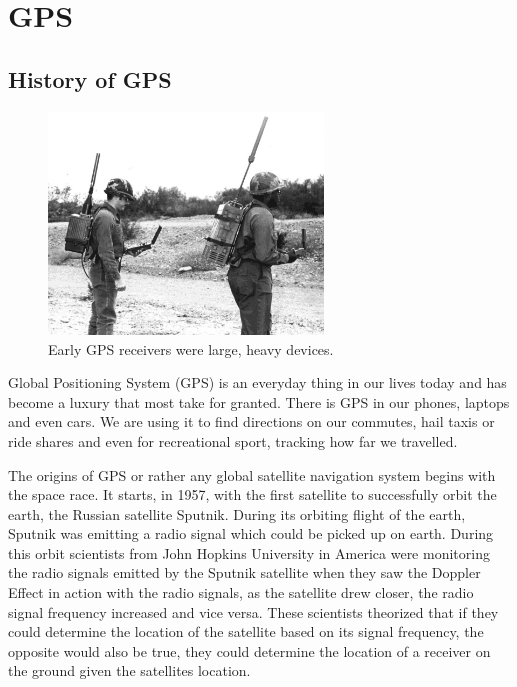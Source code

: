 \section{GPS}
\subsection{History of GPS}
\begin{figure}
	\begin{center}
		\includegraphics[width = 0.65\textwidth]{figures/historyGPS.jpg}
		\caption{Early GPS receivers were large, heavy devices. \cite{USAF1978}}
		\label{fig:2:histGPS}
	\end{center}
\end{figure}
Global Positioning System (GPS) is an everyday thing in our lives today and has become a luxury that most take for granted. There is GPS in our phones, laptops and even cars. We are using it to find directions on our commutes, hail taxis or ride shares and even for recreational sport, tracking how far we travelled.\par
\vspace{0.6cm}
The origins of GPS or rather any global satellite navigation system begins with the space race. It starts, in 1957, with the first satellite to successfully orbit the earth, the Russian satellite Sputnik. During its orbiting flight of the earth, Sputnik was emitting a radio signal which could be picked up on earth. During this orbit scientists from John Hopkins University in America were monitoring the radio signals emitted by the Sputnik satellite when they saw the Doppler Effect in action with the radio signals, as the satellite drew closer, the radio signal frequency increased and vice versa. These scientists theorized that if they could determine the location of the satellite based on its signal frequency, the opposite would also be true, they could determine the location of a receiver on the ground given the satellites location. \cite{Aerospace2021}\par

